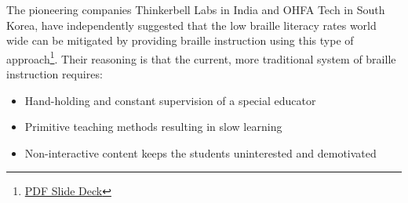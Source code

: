 \documentclass[14pt,letterpaper,twoside]{extreport}
\begin{document}
The pioneering companies Thinkerbell Labs in India and OHFA Tech in South Korea, have independently suggested that the low braille literacy rates world wide can be mitigated by providing braille instruction using this type of approach\footnote{\href{https://www.thinkerbelllabs.com/static/decks/tl_deck.pdf}{PDF Slide Deck}}. Their reasoning is that the current, more traditional system of braille instruction requires:
\begin{itemize}[leftmargin=*]
\item Hand-holding and constant supervision of a special educator
\item Primitive teaching methods resulting in slow learning
\item Non-interactive content keeps the students uninterested and demotivated
\end{itemize}
\end{document}
